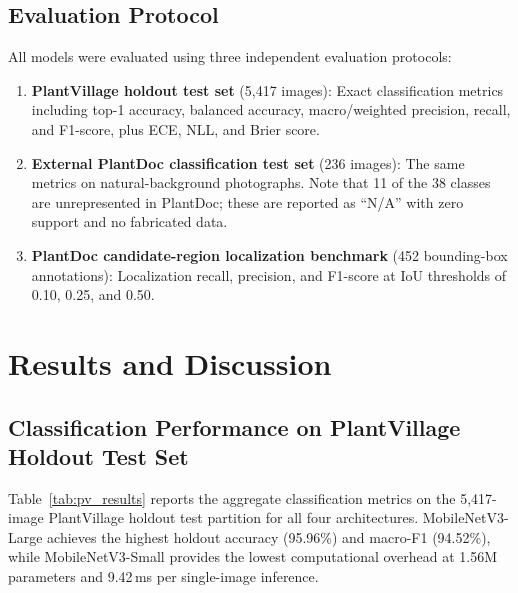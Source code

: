 \documentclass[pdflatex,sn-mathphys-num]{sn-jnl}
\theoremstyle{thmstyleone}%
\theoremstyle{thmstyletwo}%
\theoremstyle{thmstylethree}%
\begin{document}
\subsection{Evaluation Protocol}
\label{sec:eval_protocol}

All models were evaluated using three independent evaluation protocols:

\begin{enumerate}
  \item \textbf{PlantVillage holdout test set} (5{,}417 images): Exact classification
        metrics including top-1 accuracy, balanced accuracy, macro/weighted precision,
        recall, and F1-score, plus ECE, NLL, and Brier score.
  \item \textbf{External PlantDoc classification test set} (236 images): The same
        metrics on natural-background photographs. Note that 11 of the 38 classes are
        unrepresented in PlantDoc; these are reported as ``N/A'' with zero support and
        no fabricated data.
  \item \textbf{PlantDoc candidate-region localization benchmark} (452 bounding-box
        annotations): Localization recall, precision, and F1-score at IoU thresholds
        of 0.10, 0.25, and 0.50.
\end{enumerate}


\section{Results and Discussion}
\label{sec:results}

\subsection{Classification Performance on PlantVillage Holdout Test Set}
\label{sec:results_plantvillage}

Table~\ref{tab:pv_results} reports the aggregate classification metrics on the
5{,}417-image PlantVillage holdout test partition for all four architectures.
MobileNetV3-Large achieves the highest holdout accuracy (95.96\%) and macro-F1
(94.52\%), while MobileNetV3-Small provides the lowest computational overhead at
1.56M parameters and 9.42\,ms per single-image inference.
\end{document}
